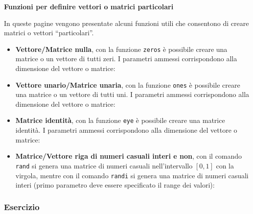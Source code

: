 \documentclass[a4paper]{article}
\newcommand{\dquotes}[1]{``#1''}
\begin{document}
    \newpage

    \begin{flushleft}
        \large
        \hypertarget{
            lab: Funzioni per definire vettori o matrici particolari
        }{
            \textcolor{Red3}{\textbf{Funzioni per definire vettori o matrici particolari}}
        }
        \label{lab: Funzioni per definire vettori o matrici particolari}
    \end{flushleft}
    In queste pagine vengono presentate alcuni funzioni utili che consentono di creare matrici o vettori \dquotes{particolari}.
    \begin{itemize}
        \item \textbf{Vettore/Matrice nulla}, con la funzione \texttt{zeros} è possibile creare una matrice o un vettore di tutti zeri. I parametri ammessi corrispondono alla dimensione del vettore o matrice:
        

        \item \textbf{Vettore unario/Matrice unaria}, con la funzione \texttt{ones} è possibile creare una matrice o un vettore di tutti uni. I parametri ammessi corrispondono alla dimensione del vettore o matrice:
        

        \newpage

        \item \textbf{Matrice identità}, con la funzione \texttt{eye} è possibile creare una matrice identità. I parametri ammessi corrispondono alla dimensione del vettore o matrice:
        

        \item \textbf{Matrice/Vettore riga di numeri casuali interi e non}, con il comando \texttt{rand} si genera una matrice di numeri casuali nell'intervallo $\left[0,1\right]$ con la virgola, mentre con il comando \texttt{randi} si genera una matrice di numeri casuali interi (primo parametro deve essere specificato il range dei valori):
        
    \end{itemize}

    \newpage

    \subsubsection{Esercizio}
\end{document}
